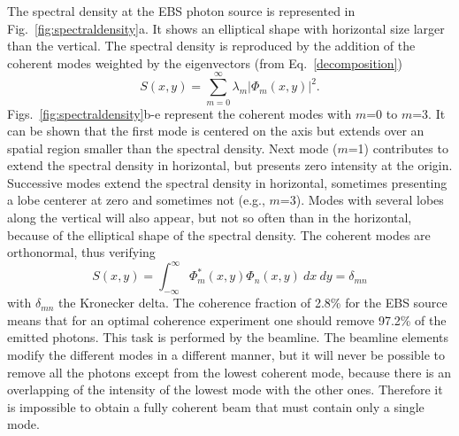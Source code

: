 \documentclass{iucr}              %
\begin{document}
The spectral density at the EBS photon source is represented in Fig.~\ref{fig:spectraldensity}a. It shows an elliptical shape with horizontal size larger than the vertical.  The spectral density is reproduced by the addition of the coherent modes weighted by the eigenvectors (from Eq.~\ref{decomposition})
\begin{equation}
S(x,y) = \sum_{m=0}^{\infty} \lambda_m |\Phi_m(x,y)|^2.
\end{equation}
Figs.~\ref{fig:spectraldensity}b-e represent the coherent modes with $m$=0 to $m$=3. It can be shown that the first mode is centered on the axis but extends over an spatial region smaller than the spectral density. Next mode ($m$=1) contributes to extend the spectral density in horizontal, but presents zero intensity at the origin. Successive modes extend  the spectral density in horizontal, sometimes presenting a lobe centerer at zero and sometimes not (e.g., $m$=3). Modes with several lobes along the vertical will also appear, but not so often than in the horizontal, because of the elliptical shape of the spectral density. The coherent modes are orthonormal, thus verifying 
\begin{equation}
S(x,y) = \int_{-\infty}^{\infty} \Phi^*_m(x,y) \Phi_n(x,y)~dx~dy = \delta_{mn}
\end{equation}
with $\delta_{mn}$ the Kronecker delta. The coherence fraction of 2.8\% for the EBS source means that for an optimal coherence experiment one should remove 97.2\% of the emitted photons. This task is performed by the beamline. The beamline elements modify the different modes in a different manner, but it will never be possible to remove all the photons except from the lowest coherent mode, because there is an overlapping of the intensity of the lowest mode with the other ones. Therefore it is impossible to obtain a fully coherent beam that must contain only a single mode. 

   
\end{document}
